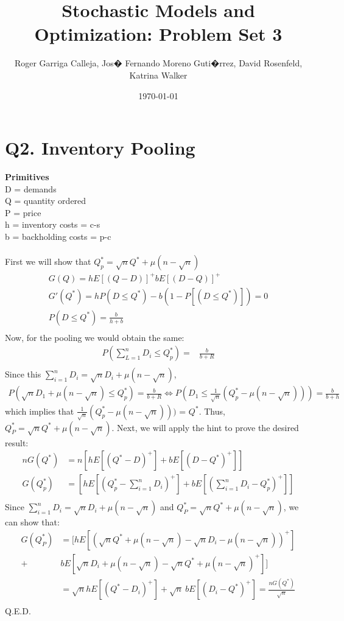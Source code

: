 \documentclass[11pt, english]{article}
\title{Stochastic Models and Optimization: Problem Set 3}
\author{Roger Garriga Calleja, Jos� Fernando Moreno Guti�rrez, David Rosenfeld, Katrina Walker}
\date{\today}
\begin{document}
	
\section{Q2. Inventory Pooling}
\textbf{Primitives}\\ D = demands \\ Q = quantity ordered \\ P = price \\ h =
inventory costs =  c-s \\ b = backholding costs = p-c \\ \\ First we will show that $Q_p^* = \sqrt{n}Q^* + \mu(n- \sqrt{n})$%
\begin{align*} 
G(Q) = hE[(Q-D)]^+bE[(D-Q)]^+ \\ G'(Q^*)= hP(D \leq Q^*) - b(1-P[(D\leq Q^*)]) =
0 \\ P(D \leq Q^*) = \frac{b}{h+b} \\ 
\end{align*}
Now, for the pooling we would obtain the same:
\begin{align*} 
P (\sum_{L= 1}^n D_i \leq Q_p^*) = &  \frac{b}{b+R} \\
\end{align*}
Since  this $\sum_{i = 1}^nD_i = \sqrt{n}D_i+\mu(n-\sqrt{n})$, 
\begin{align*}	
P(\sqrt{n}D_1 + \mu(n - \sqrt{n})\leq Q_p^*) = \frac{b}{b+R}  \Longleftrightarrow P(D_1 \leq
\frac{1}{\sqrt{n}}(Q_p^*- \mu(n-\sqrt{n})))= \frac{b}{b + h} \end{align*} 
which implies that $\frac{1}{\sqrt{n}}(Q_p^*- \mu(n-\sqrt{n})))$ = $Q^*$. Thus, $Q^*_P = \sqrt{n}Q^*+\mu(n-\sqrt{n})$.  Next, we will apply the hint to prove the desired result:
\begin{align*} nG(Q^*) &=
n[hE[(Q^*-D)^+]+bE[(D-Q^*)^+]]\\ G(Q^*_p) & =
[hE[(Q^*_p-\sum_{i=1}^nD_i)^+]+bE[(\sum_{i=1}^nD_i-Q^*_p)^+]]\\ 
\end{align*} 
Since $\sum_{i = 1}^nD_i = \sqrt{n}D_i+\mu(n-\sqrt{n})$ and $Q^*_P = \sqrt{n}Q^*+\mu(n-\sqrt{n})$, we can show that:\\
\begin{align*} 
G(Q^*_P) & =  [hE[(\sqrt{n}Q^*+\mu(n-\sqrt{n})-\sqrt{n}D_i-\mu(n-\sqrt{n}))^+] \\
+& b E[\sqrt{n}D_i+\mu(n-\sqrt{n})-\sqrt{n}Q^*+\mu(n-\sqrt{n})^+]]\\
& = \sqrt{n}hE[(Q^*-D_i)^+] + \sqrt{n} \ b E[(D_i-Q^*)^+] = \frac{nG(Q^*)}{\sqrt{n}}\\ 
\end{align*} 
Q.E.D.\\
\end{document}
